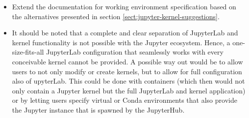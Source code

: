 \begin{itemize}
  \item Extend the documentation for working environment specification based on the alternatives presented in section \ref{sect:jupyter-kernel-suggestions}.

  \item It should be noted that a complete and clear separation of JupyterLab and kernel functionality is not possible with the Jupyter ecosystem.
  Hence, a one-size-fits-all JupyterLab configuration that seamlessly works with every conceivable kernel cannot be provided.
  A possible way out would be to allow users to not only modify or create kernels, but to allow for full configuration also of upyterLab.
  This could be done with containers (which then would not only contain a Jupyter kernel but the full JupyterLab and kernel application) or by letting users specify virtual or Conda environments that also provide the Jupyter instance that is spawned by the JupyterHub.

\end{itemize}


